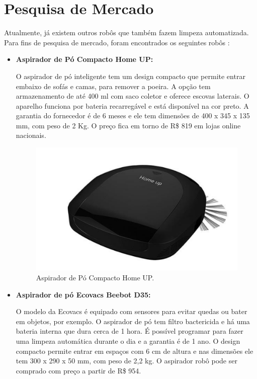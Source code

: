 
\section{Pesquisa de Mercado} %
\label{sub:pesquisa_de_mercado}

	Atualmente, já existem outros robôs que também fazem limpeza automatizada. Para fins de pesquisa de mercado, foram encontrados os seguintes robôs \cite{techtudo}:

	\begin{itemize}
		\item \textbf{Aspirador de Pó Compacto Home UP:}

			O aspirador de pó inteligente tem um design compacto que permite entrar embaixo de sofás e camas, para remover a poeira. A opção tem armazenamento de até 400 ml com saco coletor e oferece escovas laterais. O aparelho funciona por bateria recarregável e está disponível na cor preto. A garantia do fornecedor é de 6 meses e ele tem dimensões de 400 x 345 x 135 mm, com peso de 2 Kg. O preço fica em torno de R\$ 819 em lojas online nacionais.

			\begin{figure}[H]
				\centering
				\includegraphics[scale=0.55]{figuras/pm_home_up.png}
				\caption{Aspirador de Pó Compacto Home UP.}
				\label{img:pm_home_up}
			\end{figure}

		\item \textbf{Aspirador de pó Ecovacs Beebot D35:}

			 O modelo da Ecovacs é equipado com sensores para evitar quedas ou bater em objetos, por exemplo. O aspirador de pó tem filtro bactericida e há uma bateria interna que dura cerca de 1 hora. É possível programar para fazer uma limpeza automática durante o dia e a garantia é de 1 ano. O design compacto permite entrar em espaços com 6 cm de altura e nas dimensões ele tem 300 x 290 x 50 mm, com peso de 2,2 kg. O aspirador robô pode ser comprado com preço a partir de R\$ 954.


\end{itemize}
